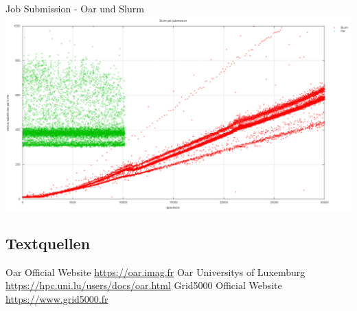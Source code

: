 \documentclass[10pt,utf8]{beamer}
\begin{document}
\begin{frame}{Job Submission - Oar und Slurm}
	\includegraphics[scale=0.22, keepaspectratio]{../output/pics/oar_slurm.png}
\end{frame}

\subsection*{Textquellen}
\begin{frame}
	\begin{itemize}[]
	    \bibitem [0] {} Oar Official Website \url{https://oar.imag.fr}
	    \bibitem [0] {} Oar Universitys of Luxemburg \url{https://hpc.uni.lu/users/docs/oar.html}
	    \bibitem [0] {} Grid5000 Official Website \url{https://www.grid5000.fr}
    \end{itemize}
\end{frame}
\end{document}
